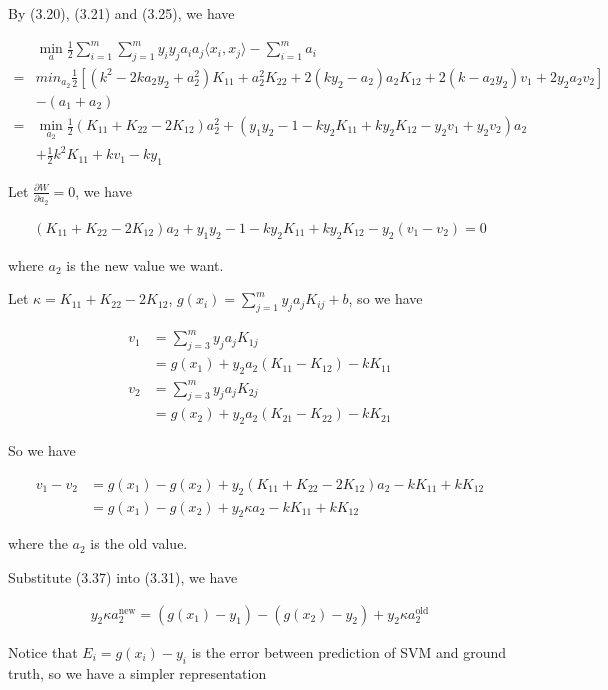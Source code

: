 \documentclass[a4paper]{report}
\begin{document}
By (3.20), (3.21) and (3.25), we have 

\begin{align}
    &\min_a \frac{1}{2}\sum_{i=1}^m\sum_{j=1}^m y_iy_ja_ia_j\langle x_i,x_j\rangle - \sum_{i=1}^m a_i \\
    =&min_{a_2}\frac{1}{2} [(k^2-2ka_2y_2+a_2^2)K_{11}+a_2^2K_{22}+2(ky_2-a_2)a_2K_{12}+2(k-a_2y_2)v_1+2y_2a_2v_2] \\
    &-(a_1+a_2) \\
    =&\min_{a_2}\frac{1}{2}(K_{11}+K_{22}-2K_{12})a_2^2+(y_1y_2-1-ky_2K_{11}+ky_2K_{12}-y_2v_1+y_2v_2)a_2 \\
    & +\frac{1}{2}k^2K_{11}+kv_1-ky_1
\end{align}

Let $\frac{\partial W}{\partial a_2}=0$, we have

\begin{align}
    (K_{11}+K_{22}-2K_{12})a_2+y_1y_2-1-ky_2K_{11}+ky_2K_{12}-y_2(v_1-v_2)=0
\end{align}

where $a_2$ is the new value we want.

Let $\kappa=K_{11}+K_{22}-2K_{12}$, $g(x_i)=\sum_{j=1}^my_ja_jK_{ij} + b$, so we have

\begin{align}
    v_1 &=\sum_{j=3}^my_ja_jK_{1j} \\
    &=g(x_1)+y_2a_2(K_{11}-K_{12})-kK_{11} \\
    v_2 &=\sum_{j=3}^my_ja_jK_{2j} \\
    &=g(x_2)+y_2a_2(K_{21}-K_{22})-kK_{21} 
\end{align}

So we have

\begin{align}
    v_1-v_2&=g(x_1)-g(x_2)+y_2(K_{11}+K_{22}-2K_{12})a_2-kK_{11}+kK_{12} \\
    &=g(x_1)-g(x_2)+y_2\kappa a_2-kK_{11}+kK_{12} 
\end{align}

where the $a_2$ is the old value.

Substitute (3.37) into (3.31), we have

\begin{align}
    y_2\kappa a_2^{\mathrm{new}}=(g(x_1)-y_1)-(g(x_2)-y_2)+y_2\kappa a_2^{\mathrm{old}}
\end{align}

Notice that $E_i=g(x_i)-y_i$ is the error between prediction of SVM and ground truth, so we have a simpler representation
\end{document}

